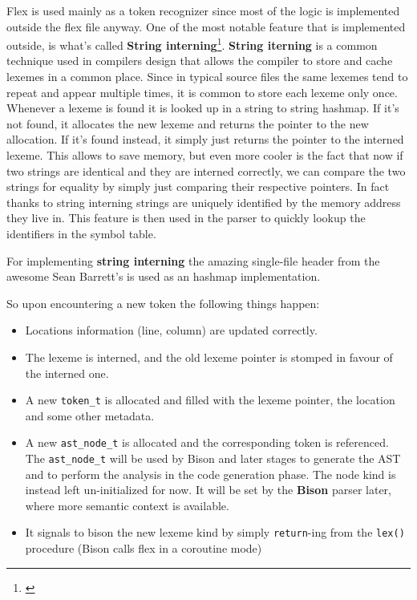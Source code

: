 \documentclass[a4paper]{article}
\newcommand{\urlref}[3][blue]{\href{#2}{\color{#1}{#3}}}%
\begin{document}
Flex is used mainly as a token recognizer since most of the logic is implemented outside the flex
file anyway. One of the most notable feature that is implemented outside,
is what's called \textbf{String interning}\footnote{\urlref{https://en.wikipedia.org/wiki/String_interning}{String Interning Wikipedia Article}}.
\textbf{String iterning} is a common technique used in compilers design that allows the compiler to
store and cache lexemes in a common place. Since in typical source files
the same lexemes tend to repeat and appear multiple times, it is common to store each lexeme only once. Whenever
a lexeme is found it is looked up in a string to string hashmap. If it's not found, it allocates
the new lexeme and returns the pointer to the new allocation. If it's found instead, it simply just returns the pointer to the interned lexeme. This allows to save
memory, but even more cooler is the fact that now if two strings are identical and they are interned correctly,
we can compare the two strings for equality by simply just comparing their respective pointers. In fact
thanks to string interning strings are uniquely identified by the memory address they live in.
This feature is then used in the parser
to quickly lookup the identifiers in the symbol table.

For implementing \textbf{string interning} the amazing \urlref{https://github.com/nothings/stb/blob/master/stb_ds.h}{stb\_ds.h} single-file header
from  the awesome Sean Barrett's \urlref{https://github.com/nothings/stb}{stb libraries} is used as an hashmap implementation.

So upon encountering a new token the following things happen:

\begin{itemize}
\item Locations information (line, column) are updated correctly.
\item The lexeme is interned, and the old lexeme pointer is stomped in favour of the interned one.
\item A new \texttt{token\_t} is allocated and filled with the lexeme pointer, the location and some other metadata.
\item A new \texttt{ast\_node\_t} is allocated and the corresponding token is referenced. The \texttt{ast\_node\_t} will be
    used by Bison and later stages to generate the AST and to perform the analysis in the code generation phase. The node
    kind is instead left un-initialized for now. It will be set by the \textbf{Bison} parser later, where more semantic context is available.
\item It signals to bison the new lexeme kind by simply \texttt{return}-ing from the \texttt{lex()} procedure (Bison calls flex in a coroutine mode)
\end{itemize}
\end{document}

